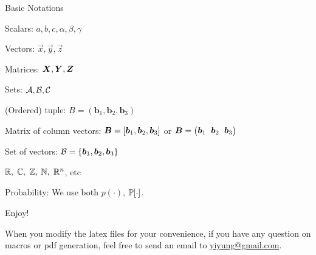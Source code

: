 \documentclass[handout,fleqn,aspectratio=169]{beamer}
\begin{document}
\begin{frame}{Basic Notations}

\plitemsep 0.1in

\bci 
\item Scalars: $a,b,c,\alpha,\beta,\gamma$

\item Vectors: $\vec{x},\vec{y},\vec{z}$

\item Matrices: $\bm{X},\bm{Y},\bm{Z}$

\item Sets: $\mathcal A, \mathcal B, \mathcal C$

\item (Ordered) tuple: $B=(\bm{b}_1, \bm{b}_2, \bm{b}_3)$

\item Matrix of column vectors: $\bm{B} = [\bm{b}_1, \bm{b}_2, \bm{b}_3]$ or 
$\mB = \rowvec{\vb_1 & \vb_2 & \vb_3}$

\item Set of vectors:  $\mathcal B = \{\bm{b}_1, \bm{b}_2, \bm{b}_3 \}$

\item ${\mathbb R},$ ${\mathbb C},$ ${\mathbb Z},$ ${\mathbb N},$ ${\mathbb R}^n$, etc

\item Probability: We use both $p(\cdot)$, $\mathbb{P}[ \cdot ]$.
\eci
\end{frame}

\begin{frame}{}
\vspace{2cm}
\LARGE Enjoy!

\bigskip
\large When you modify the latex files for your convenience, if you have any question on macros or pdf generation, feel free to send an email to \url{yiyung@gmail.com}.
\end{frame}


\end{document}
